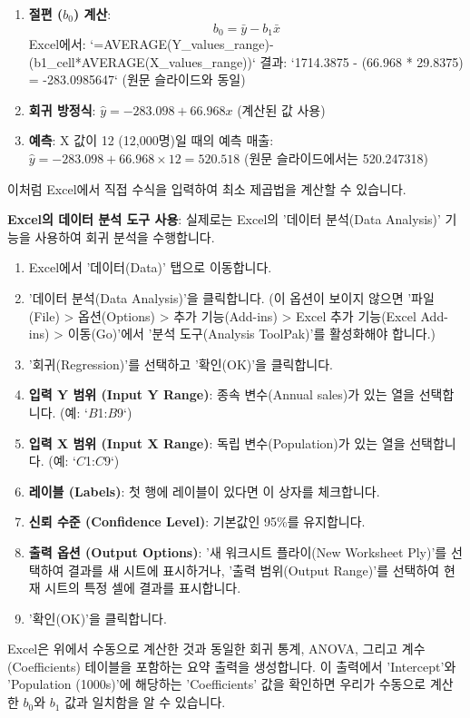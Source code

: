 \documentclass[11pt,a4paper]{article}
\begin{document}
\begin{tcolorbox}[examplebox, title=Excel 실습: 인구 및 매출 데이터]
\begin{enumerate}[label=\arabic*.]
    \item \textbf{절편 ($b_0$) 계산}:
    \begin{equation*}
    b_0 = \bar{y} - b_1\bar{x}
    \end{equation*}
    Excel에서: `=AVERAGE(Y_values_range)-(b1_cell*AVERAGE(X_values_range))`
    결과: `1714.3875 - (66.968 * 29.8375) = -283.0985647` (원문 슬라이드와 동일)

    \item \textbf{회귀 방정식}:
    $\hat{y} = -283.098 + 66.968x$ (계산된 값 사용)

    \item \textbf{예측}: X 값이 12 (12,000명)일 때의 예측 매출:
    $\hat{y} = -283.098 + 66.968 \times 12 = 520.518$ (원문 슬라이드에서는 520.247318)
\end{enumerate}
이처럼 Excel에서 직접 수식을 입력하여 최소 제곱법을 계산할 수 있습니다.

\textbf{Excel의 데이터 분석 도구 사용}:
실제로는 Excel의 '데이터 분석(Data Analysis)' 기능을 사용하여 회귀 분석을 수행합니다.
\begin{enumerate}[label=\arabic*.]
    \item Excel에서 '데이터(Data)' 탭으로 이동합니다.
    \item '데이터 분석(Data Analysis)'을 클릭합니다. (이 옵션이 보이지 않으면 '파일(File) > 옵션(Options) > 추가 기능(Add-ins) > Excel 추가 기능(Excel Add-ins) > 이동(Go)'에서 '분석 도구(Analysis ToolPak)'를 활성화해야 합니다.)
    \item '회귀(Regression)'를 선택하고 '확인(OK)'을 클릭합니다.
    \item \textbf{입력 Y 범위 (Input Y Range)}: 종속 변수(Annual sales)가 있는 열을 선택합니다. (예: `$B$1:$B$9`)
    \item \textbf{입력 X 범위 (Input X Range)}: 독립 변수(Population)가 있는 열을 선택합니다. (예: `$C$1:$C$9`)
    \item \textbf{레이블 (Labels)}: 첫 행에 레이블이 있다면 이 상자를 체크합니다.
    \item \textbf{신뢰 수준 (Confidence Level)}: 기본값인 95\%를 유지합니다.
    \item \textbf{출력 옵션 (Output Options)}: '새 워크시트 플라이(New Worksheet Ply)'를 선택하여 결과를 새 시트에 표시하거나, '출력 범위(Output Range)'를 선택하여 현재 시트의 특정 셀에 결과를 표시합니다.
    \item '확인(OK)'을 클릭합니다.
\end{enumerate}
Excel은 위에서 수동으로 계산한 것과 동일한 회귀 통계, ANOVA, 그리고 계수(Coefficients) 테이블을 포함하는 요약 출력을 생성합니다. 이 출력에서 'Intercept'와 'Population (1000s)'에 해당하는 'Coefficients' 값을 확인하면 우리가 수동으로 계산한 $b_0$와 $b_1$ 값과 일치함을 알 수 있습니다.
\end{tcolorbox}
\end{document}

